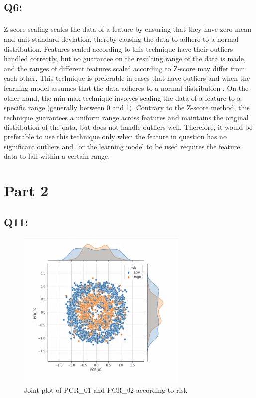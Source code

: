 \documentclass{article}
\begin{document}
\subsection*{Q6:}
    \paragraph*{}
    Z-score scaling scales the data of a feature by ensuring that they have zero mean and unit standard deviation, thereby causing the data to adhere to a normal distribution. Features scaled according to this technique have their outliers handled correctly, but no guarantee on the resulting range of the data is made, and the ranges of different features scaled according to Z-score may differ from each other. This technique is preferable in cases that have outliers and when the learning model assumes that the data adheres to a normal distribution . On-the-other-hand, the min-max technique involves scaling the data of a feature to a specific range (generally between 0 and 1). Contrary to the Z-score method, this technique guarantees a uniform range across features and maintains the original distribution of the data, but does not handle outliers well. Therefore, it would be preferable to use this technique only when the feature in question has no significant outliers and\_or the learning model to be used requires the feature data to fall within a certain range.
\section*{Part 2}
\subsection*{Q11:}
    \begin{figure}[H]
        \centering
        \includegraphics{q11_pcr_01_pcr_02_j_plot.png}
        \caption{Joint plot of PCR\_01 and PCR\_02 according to risk}
        \label{fig:pcr_01_pcr_02_j_plot}
    \end{figure}
\end{document}
